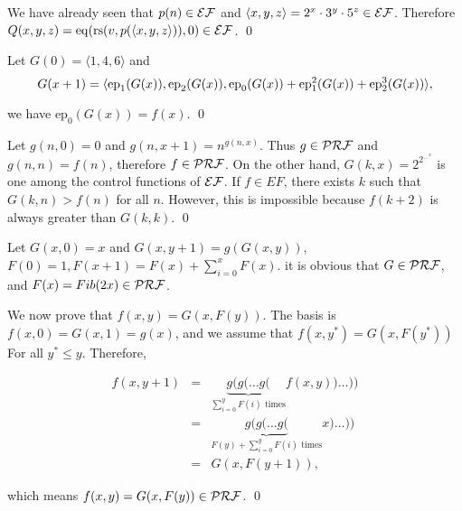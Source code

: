 \documentclass[11pt]{article}
\begin{document}

\begin{pf} \rm
 We have already seen that $p(n)\in\mathcal{EF}$ and
 $\langle x, y, z\rangle = 2^x\cdot 3^y\cdot 5^z \in\mathcal{EF}$.
 Therefore $Q(x, y, z) = \mathrm{eq}(\mathrm{rs}(v, p(\langle x, y, z\rangle)), 0) \in\mathcal{EF}$. \qed
\end{pf}


\begin{pf} \rm
  Let $G(0) = \langle 1, 4, 6\rangle$ and
\[
 G(x + 1) = \langle
   \mathrm{ep}_1(G(x)),
   \mathrm{ep}_2(G(x)),
   \mathrm{ep}_0( G(x) ) + \mathrm{ep}_1^2(G(x)) + \mathrm{ep}_2^3(G(x))
 \rangle,
\]

\noindent we have $\mathrm{ep}_0(G(x)) = f(x)$. \qed
\end{pf}


\begin{pf} \rm
 Let $g(n, 0) = 0$ and 
 $g(n, x + 1) = n^{ g(n, x)}$. Thus $g\in \mathcal{PRF}$ and $g(n, n) = f(n)$,
 therefore $f\in\mathcal{PRF}$. On the other hand, $G(k, x) = 2^{2^{\ldots^x}}$ is
 one among the control functions of $\mathcal{EF}$. If $f\in EF$, there exists
 $k$ such that $G(k, n) > f(n)$ for all $n$. However, this is impossible
 because $f(k + 2)$ is always greater than $G(k, k)$. \qed
\end{pf}



\begin{pf} \rm
 Let $G(x, 0) = x$ and $G(x, y + 1) = g(G(x, y))$,
 $F(0) = 1, F(x + 1) = F(x) + \sum_{i = 0}^{x} F(x)$. it is obvious that
 $G\in\mathcal{PRF}$, and $F(x) = Fib(2x) \in \mathcal{PRF}$.
 
 We now prove that $f(x, y) = G(x, F(y))$.
 The basis is $f(x, 0) = G(x, 1) = g(x)$, and we assume that
 $f(x, y^*) = G(x, F(y^*))$ For all $y^* \leq y$. Therefore, 

\[
 \begin{array}{rcl}
 f(x, y + 1)  & = &  \underbrace{g(g(\ldots g(}_{\sum_{i = 0}^{y} F(i)\textrm{ times}}
   f(x, y) )\ldots )) \\
 & = & \underbrace{g(g(\ldots g(}_{F(y) + \sum_{i = 0}^{y} F(i)\textrm{ times}}
   x )\ldots )) \\
   & = & G(x, F(y + 1)),
  \end{array}
\]

\noindent which means $f(x, y) = G(x, F(y))\in \mathcal{PRF}$. \qed
\end{pf}
\end{document}
